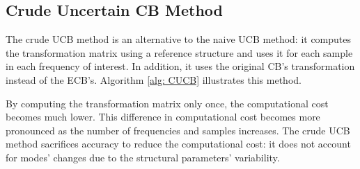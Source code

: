 %
%

\subsection{Crude Uncertain CB Method}
\label{ssec: CUCB}

The crude UCB method is an alternative to the naive UCB method: it computes the transformation matrix using a reference structure and uses it for each sample in each frequency of interest.
In addition, it uses the original CB's transformation instead of the ECB's.
Algorithm \ref{alg: CUCB} illustrates this method.



By computing the transformation matrix only once, the computational cost becomes much lower.
This difference in computational cost becomes more pronounced as the number of frequencies and samples increases.
The crude UCB method sacrifices accuracy to reduce the computational cost: it does not account for modes' changes due to the structural parameters' variability.